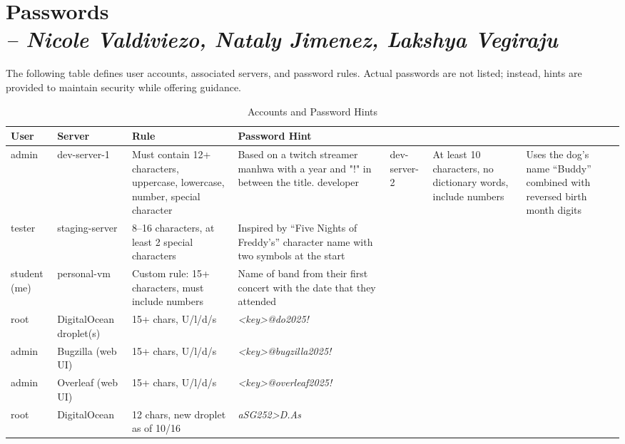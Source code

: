 \chapter{Passwords \\
\small{\textit{-- Nicole Valdiviezo, Nataly Jimenez, Lakshya Vegiraju}}
\label{Chapter::Passwords}}

The following table defines user accounts, associated servers, and password rules. Actual passwords are not listed; instead, hints are provided to maintain security while offering guidance.

\begin{longtable}{|p{3cm}|p{3cm}|p{3cm}|p{6cm}|}
\caption{Accounts and Password Hints}\label{tab:passwords}\\
\hline
\textbf{User} & \textbf{Server} & \textbf{Rule} & \textbf{Password Hint} \\
\hline
admin & dev-server-1 & Must contain 12+ characters, uppercase, lowercase, number, special character & Based on a twitch streamer manhwa with a year and "!" in between the title.
\hline
developer & dev-server-2 & At least 10 characters, no dictionary words, include numbers & Uses the dog’s name ``Buddy'' combined with reversed birth month digits \\
\hline
tester & staging-server & 8–16 characters, at least 2 special characters & Inspired by ``Five Nights of Freddy's'' character name with two symbols at the start \\
\hline
student (me) & personal-vm & Custom rule: 15+ characters, must include numbers & Name of band from their first concert with the date that they attended \\
root & DigitalOcean droplet(s) & 15+ chars, U/l/d/s & \emph{<key>@do2025!} \\
\hline
admin & Bugzilla (web UI) & 15+ chars, U/l/d/s & \emph{<key>@bugzilla2025!} \\
\hline
admin & Overleaf (web UI) & 15+ chars, U/l/d/s & \emph{<key>@overleaf2025!} \\
\hline
root & DigitalOcean & 12 chars, new droplet as of 10/16 & \emph{aSG252>D.As} \\
\hline

\end{longtable}